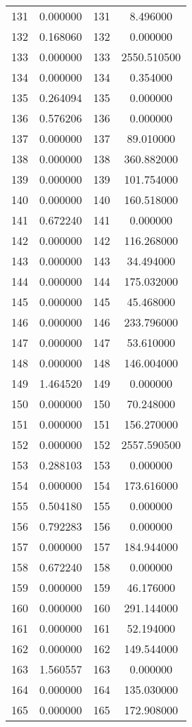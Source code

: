 \documentclass[12pt]{article}
\begin{document}
\begin{longtable}{@{}cccc@{}}
131 & 0.000000 & 131 & 8.496000 \\
132 & 0.168060 & 132 & 0.000000 \\
133 & 0.000000 & 133 & 2550.510500 \\
134 & 0.000000 & 134 & 0.354000 \\
135 & 0.264094 & 135 & 0.000000 \\
136 & 0.576206 & 136 & 0.000000 \\
137 & 0.000000 & 137 & 89.010000 \\
138 & 0.000000 & 138 & 360.882000 \\
139 & 0.000000 & 139 & 101.754000 \\
140 & 0.000000 & 140 & 160.518000 \\
141 & 0.672240 & 141 & 0.000000 \\
142 & 0.000000 & 142 & 116.268000 \\
143 & 0.000000 & 143 & 34.494000 \\
144 & 0.000000 & 144 & 175.032000 \\
145 & 0.000000 & 145 & 45.468000 \\
146 & 0.000000 & 146 & 233.796000 \\
147 & 0.000000 & 147 & 53.610000 \\
148 & 0.000000 & 148 & 146.004000 \\
149 & 1.464520 & 149 & 0.000000 \\
150 & 0.000000 & 150 & 70.248000 \\
151 & 0.000000 & 151 & 156.270000 \\
152 & 0.000000 & 152 & 2557.590500 \\
153 & 0.288103 & 153 & 0.000000 \\
154 & 0.000000 & 154 & 173.616000 \\
155 & 0.504180 & 155 & 0.000000 \\
156 & 0.792283 & 156 & 0.000000 \\
157 & 0.000000 & 157 & 184.944000 \\
158 & 0.672240 & 158 & 0.000000 \\
159 & 0.000000 & 159 & 46.176000 \\
160 & 0.000000 & 160 & 291.144000 \\
161 & 0.000000 & 161 & 52.194000 \\
162 & 0.000000 & 162 & 149.544000 \\
163 & 1.560557 & 163 & 0.000000 \\
164 & 0.000000 & 164 & 135.030000 \\
165 & 0.000000 & 165 & 172.908000 \\

\end{longtable}
\end{document}
